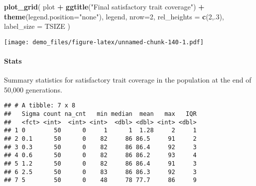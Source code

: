\documentclass[]{book}
\newenvironment{Shaded}{\begin{snugshade}}{\end{snugshade}}
\newcommand{\DataTypeTok}[1]{\textcolor[rgb]{0.13,0.29,0.53}{#1}}
\newcommand{\DecValTok}[1]{\textcolor[rgb]{0.00,0.00,0.81}{#1}}
\newcommand{\KeywordTok}[1]{\textcolor[rgb]{0.13,0.29,0.53}{\textbf{#1}}}
\newcommand{\NormalTok}[1]{#1}
\newcommand{\OperatorTok}[1]{\textcolor[rgb]{0.81,0.36,0.00}{\textbf{#1}}}
\newcommand{\OtherTok}[1]{\textcolor[rgb]{0.56,0.35,0.01}{#1}}
\newcommand{\StringTok}[1]{\textcolor[rgb]{0.31,0.60,0.02}{#1}}
\let\oldparagraph\paragraph
\renewcommand{\paragraph}[1]{\oldparagraph{#1}\mbox{}}
\begin{document}
\begin{Shaded}
\begin{Highlighting}[]
\KeywordTok{plot_grid}\NormalTok{(}
\NormalTok{  plot }\OperatorTok{+}
\StringTok{    }\KeywordTok{ggtitle}\NormalTok{(}\StringTok{"Final satisfactory trait coverage"}\NormalTok{) }\OperatorTok{+}
\StringTok{    }\KeywordTok{theme}\NormalTok{(}\DataTypeTok{legend.position=}\StringTok{"none"}\NormalTok{),}
\NormalTok{  legend,}
  \DataTypeTok{nrow=}\DecValTok{2}\NormalTok{,}
  \DataTypeTok{rel_heights =} \KeywordTok{c}\NormalTok{(}\DecValTok{2}\NormalTok{,.}\DecValTok{3}\NormalTok{),}
  \DataTypeTok{label_size =}\NormalTok{ TSIZE}
\NormalTok{)}
\end{Highlighting}
\end{Shaded}

\texttt{[image: demo\_files/figure-latex/unnamed-chunk-140-1.pdf]}

\hypertarget{stats-68}{%
\paragraph{Stats}\label{stats-68}}

Summary statistics for satisfactory trait coverage in the population at the end of 50,000 generations.

\begin{Shaded}
\end{Shaded}

\begin{verbatim}
## # A tibble: 7 x 8
##   Sigma count na_cnt   min median  mean   max   IQR
##   <fct> <int>  <int> <int>  <dbl> <dbl> <int> <dbl>
## 1 0        50      0     1      1  1.28     2     1
## 2 0.1      50      0    82     86 86.5     91     2
## 3 0.3      50      0    82     86 86.4     92     3
## 4 0.6      50      0    82     86 86.2     93     4
## 5 1.2      50      0    82     86 86.4     91     3
## 6 2.5      50      0    83     86 86.3     92     3
## 7 5        50      0    48     78 77.7     86     9
\end{verbatim}
\end{document}
